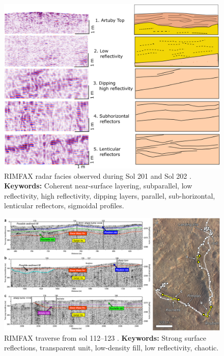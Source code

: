 \begin{figure}
    \centering
    \includegraphics[width=0.9\linewidth]{Figures/0.5RIMFAX/Hamran_2022-f5.jpg}
    \caption[RIMFAX radar facies observed during Sol 201 and Sol 202.]{RIMFAX radar facies observed during Sol 201 and Sol 202 \citep{Hamran2022}. \textbf{Keywords:} Coherent near-surface layering, subparallel, low reflectivity, high reflectivity, dipping layers, parallel, sub-horizontal, lenticular reflectors, sigmoidal profiles.}
    \label{fig:Hamran22-5}
\end{figure}

\clearpage

\begin{figure}[h!]
    \centering
    \includegraphics[width=0.9\linewidth]{Figures/0.5RIMFAX/Horgan_2023-fig1.jpg}
    \caption[RIMFAX traverse from sol 112–123.]{RIMFAX traverse from sol 112–123 \citep{Horgan2023}. \textbf{Keywords:} Strong surface reflections, transparent unit, low-density fill, low reflectivity, chaotic.}
    \label{fig:Horgan23-1}
\end{figure}

